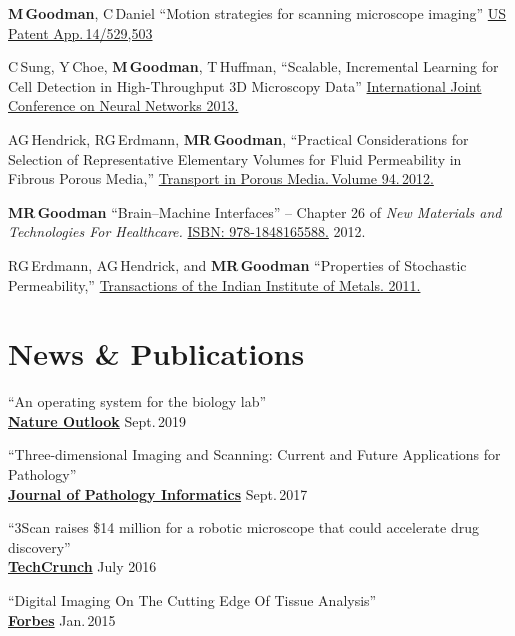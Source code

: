 \documentclass{res}
\let\oldsection\section
\renewcommand{\section}[1]{\needspace{4\baselineskip}\oldsection{#1}}
\begin{document}
\begin{resume}
  \textbf{M\,Goodman}, C\,Daniel
  ``Motion strategies for scanning microscope imaging''
  \href{https://patents.google.com/patent/US20150138532A1/en}{US Patent App.\,14/529,503}

  C\,Sung, Y\,Choe, \textbf{M\,Goodman}, T\,Huffman,
  ``Scalable, Incremental Learning for Cell Detection in High-Throughput 3D Microscopy Data''
  \href{https://doi.org/10.1109/IJCNN.2013.6706769}{International Joint Conference on Neural Networks 2013.}

  AG\,Hendrick, RG\,Erdmann, \textbf{MR\,Goodman},
  ``Practical Considerations for Selection of Representative
  Elementary Volumes for Fluid Permeability in Fibrous Porous Media,''
  \href{http://dx.doi.org/10.1007/s11242-012-0051-8}{Transport in Porous Media.\,Volume 94.\,2012.}

  \textbf{MR\,Goodman}
  ``Brain--Machine Interfaces'' -- Chapter 26 of \textit{New Materials and Technologies For Healthcare.}
  \href{http://amzn.com/1848165587}{ISBN: 978-1848165588.} 2012.

  RG\,Erdmann, AG\,Hendrick, and \textbf{MR\,Goodman}
  ``Properties of Stochastic Permeability,''
  \href{http://dx.doi.org/10.1007/s12666-009-0038-5}{Transactions of the Indian Institute of Metals. 2011.}

\section{News \& Publications}
  ``An operating system for the biology lab'' \\
  \href{https://www.nature.com/articles/d41586-019-02875-z}{\textbf{Nature Outlook}} \hfill Sept.\,2019

  ``Three-dimensional Imaging and Scanning: Current and Future Applications for Pathology'' \\
  \href{https://www.ncbi.nlm.nih.gov/pmc/articles/PMC5609355/}{\textbf{Journal of Pathology Informatics}} \hfill Sept.\,2017
  
  ``3Scan raises \$14 million for a robotic microscope that could accelerate drug discovery'' \\
  \href{https://techcrunch.com/2016/07/11/3scan-raises-14-million-for-a-robotic-microscope-that-could-accelerate-drug-discovery/
  }{\textbf{TechCrunch}} \hfill July 2016
  
  ``Digital Imaging On The Cutting Edge Of Tissue Analysis'' \\
  \href{https://www.forbes.com/sites/joshwolfe/2015/01/28/digital-imaging-on-the-cutting-edge-of-tissue-analysis/}{\textbf{Forbes}} \hfill Jan.\,2015
  

\end{resume}
\end{document}
